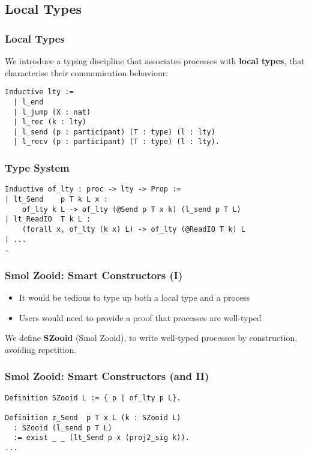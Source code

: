 \subsection{Local Types}

\begin{frame}[fragile]
    \frametitle{Local Types}
    We introduce a typing discipline that associates processes with \textbf{local types}, that 
characterise their communication behaviour:

    \begin{verbatim}
Inductive lty :=
  | l_end
  | l_jump (X : nat)
  | l_rec (k : lty)
  | l_send (p : participant) (T : type) (l : lty)
  | l_recv (p : participant) (T : type) (l : lty).
    \end{verbatim}
\end{frame}

\begin{frame}[fragile]
    \frametitle{Type System}
    \begin{verbatim}
Inductive of_lty : proc -> lty -> Prop :=
| lt_Send    p T k L x :
    of_lty k L -> of_lty (@Send p T x k) (l_send p T L)
| lt_ReadIO  T k L :
    (forall x, of_lty (k x) L) -> of_lty (@ReadIO T k) L
| ...
.
    \end{verbatim}
\end{frame}

\begin{frame}[fragile]
    \frametitle{Smol Zooid: Smart Constructors (I)}
    \begin{sticky}
\vspace{-.5cm}
    \begin{itemize}
        \item It would be tedious to type up both a local type and a process
        \item Users would need to provide a proof that processes are well-typed
    \end{itemize}
    \end{sticky}
    \begin{greenbox}{}
        We define \textbf{SZooid} (Smol Zooid), to write
well-typed processes by construction, avoiding repetition.
    \end{greenbox}
\end{frame}

\begin{frame}[fragile]
    \frametitle{Smol Zooid: Smart Constructors (and II)}
\begin{verbatim}
Definition SZooid L := { p | of_lty p L}.

Definition z_Send  p T x L (k : SZooid L)
  : SZooid (l_send p T L)
  := exist _ _ (lt_Send p x (proj2_sig k)).
...
\end{verbatim}
\end{frame}

